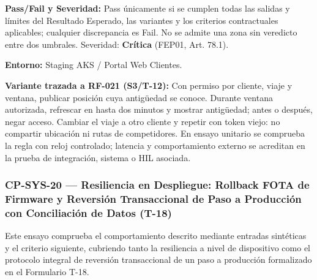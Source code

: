 \par\noindent\textbf{Pass/Fail y Severidad:} Pass únicamente si se cumplen todas las salidas y límites del Resultado Esperado, las variantes y los criterios contractuales aplicables; cualquier discrepancia es Fail. No se admite una zona sin veredicto entre dos umbrales. Severidad: \textbf{Crítica} (FEP01, Art. 78.1).\par
\par\noindent\textbf{Entorno:} Staging AKS / Portal Web Clientes.\par







\par\noindent\textbf{Variante trazada a RF-021 (S3/T-12):} Con permiso por cliente, viaje y ventana, publicar posición cuya antigüedad se conoce. Durante ventana autorizada, refrescar en hasta dos minutos y mostrar antigüedad; antes o después, negar acceso. Cambiar el viaje a otro cliente y repetir con token viejo: no compartir ubicación ni rutas de competidores. En ensayo unitario se comprueba la regla con reloj controlado; latencia y comportamiento externo se acreditan en la prueba de integración, sistema o HIL asociada.\par
\subsubsection*{CP-SYS-20 — Resiliencia en Despliegue: Rollback FOTA de Firmware y Reversión Transaccional de Paso a Producción con Conciliación de Datos (T-18)}\label{sec:9-cp-sys-20}
Este ensayo comprueba el comportamiento descrito mediante entradas sintéticas y el criterio siguiente, cubriendo tanto la resiliencia a nivel de dispositivo como el protocolo integral de reversión transaccional de un paso a producción formalizado en el Formulario T-18.

